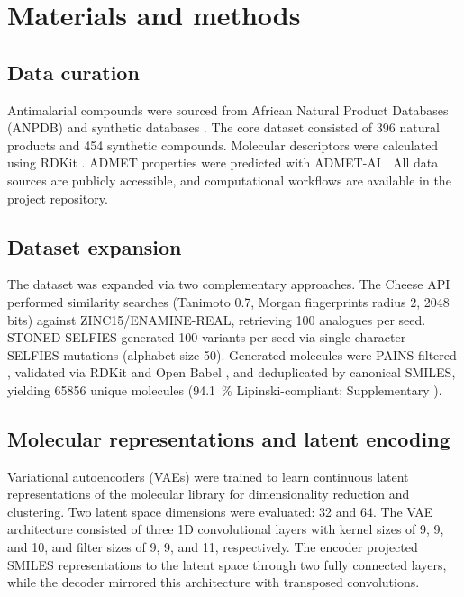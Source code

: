 \documentclass[journal=jcisd8,manuscript=article]{achemso}
\begin{document}
\section{Materials and methods}

\subsection{Data curation}

Antimalarial compounds were sourced from African Natural Product Databases (ANPDB) \cite{Sorokina2021,Onguene2018,NtieKang2017,Simoben2020} and synthetic databases \cite{Knox2023,Spangenberg2013}. The core dataset consisted of \num{396} natural products and \num{454} synthetic compounds. Molecular descriptors were calculated using RDKit \cite{GregLandrum2025}. ADMET properties were predicted with ADMET-AI \cite{Swanson2024}. All data sources are publicly accessible, and computational workflows are available in the project repository.

\subsection{Dataset expansion}

The dataset was expanded via two complementary approaches. The Cheese API \cite{lzicar_cheese_2024} performed similarity searches (Tanimoto \num{0.7}, Morgan
fingerprints radius \num{2}, \num{2048} bits) against ZINC15/ENAMINE-REAL, retrieving \num{100} analogues per seed. STONED-SELFIES \cite{Nigam2021} generated
\num{100} variants per seed via single-character SELFIES mutations (alphabet size \num{50}). Generated molecules were PAINS-filtered \cite{Baell2010}, validated
via RDKit and Open Babel \cite{OBoyle2011}, and deduplicated by canonical SMILES, yielding \num{65856} unique molecules (\qty{94.1}{\percent}
Lipinski-compliant; Supplementary ).

\subsection{Molecular representations and latent encoding}

Variational autoencoders (VAEs) \cite{Kingma2013} were trained to learn continuous latent representations of the molecular library for dimensionality reduction and clustering. Two latent space dimensions were evaluated: \num{32} and \num{64}. The VAE architecture consisted of three 1D convolutional layers with kernel sizes of \num{9}, \num{9}, and \num{10}, and filter sizes of \num{9}, \num{9}, and \num{11}, respectively. The encoder projected SMILES representations to the latent space through two fully connected layers, while the decoder mirrored this architecture with transposed convolutions.
\end{document}

